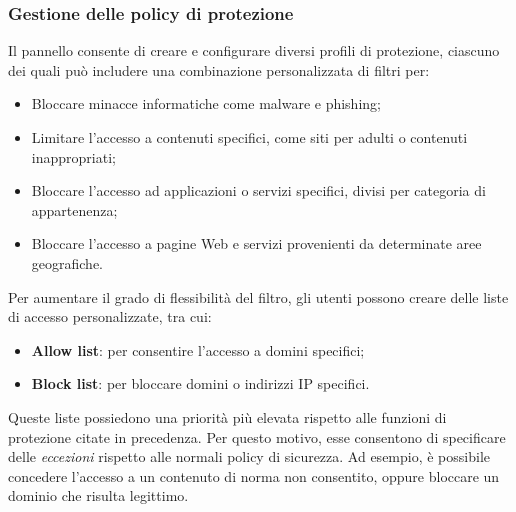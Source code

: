 \subsubsection{Gestione delle policy di protezione}
Il pannello consente di creare e configurare diversi profili di protezione, ciascuno dei quali può includere una combinazione personalizzata di filtri per:
\begin{itemize}
  \item Bloccare minacce informatiche come malware e phishing;
  \item Limitare l'accesso a contenuti specifici, come siti per adulti o contenuti inappropriati;
  \item Bloccare l'accesso ad applicazioni o servizi specifici, divisi per categoria di appartenenza;
  \item Bloccare l'accesso a pagine Web e servizi provenienti da determinate aree geografiche.
\end{itemize}

Per aumentare il grado di flessibilità del filtro, gli utenti possono creare delle liste di accesso personalizzate, tra cui:
\begin{itemize}
  \item \textbf{Allow list}: per consentire l'accesso a domini specifici;
  \item \textbf{Block list}: per bloccare domini o indirizzi IP specifici.
\end{itemize}
Queste liste possiedono una priorità più elevata rispetto alle funzioni di protezione citate in precedenza. Per questo motivo, esse consentono di specificare delle \emph{eccezioni} rispetto alle normali policy di sicurezza. Ad esempio, è possibile concedere l'accesso a un contenuto di norma non consentito, oppure bloccare un dominio che risulta legittimo.

